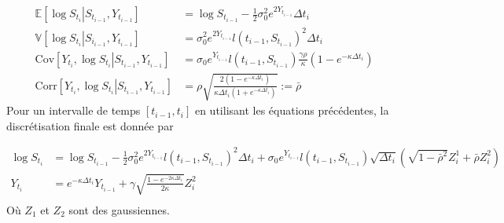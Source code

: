 \documentclass[a4paper,12pt]{report}
\numberwithin{equation}{section}
\theoremstyle{definition}
\numberwithin{equation}{section}
\begin{document}
\begin{equation}
\label{2}
\begin{split}
\mathbb{E}\left[\left.\log S_{t_i}\right\vert S_{t_{i-1}},Y_{t_{i-1}}\right]&=\log S_{t_{i-1}}-\frac{1}{2}\sigma_0^2e^{2Y_{t_{i-1}}}\Delta t_i\\
\mathbb{V}\left[\left.\log S_{t_i}\right\vert S_{i_{i-1}}, Y_{t_{i-1}}\right]&=\sigma_0^2e^{2Y_{t_{i-1}}}l(t_{i-1},S_{t_{i-1}})^2\Delta t_i\\
\text{Cov}\left[\left.Y_{t_i},\log S_{t_i}\right\vert S_{t_{i-1}}, Y_{t_{i-1}}\right]&=\sigma_0 e^{Y_{t_{i-1}}}l(t_{i-1},S_{t_{i-1}})\frac{\gamma\rho}{\kappa}\left(1-e^{-\kappa\Delta t_i}\right)\\
\text{Corr}\left[\left.Y_{t_i},\log S_{t_i}\right\vert S_{t_{i-1}}, Y_{t_{i-1}}\right]&=\rho\sqrt{\frac{2(1-e^{-\kappa\Delta t_i})}{\kappa\Delta t_i(1+e^{-\kappa\Delta t_i})}}:= \bar \rho
\end{split}
\end{equation}
Pour un intervalle de temps $[t_{i-1},t_i]$ en utilisant les équations précédentes, la discrétisation finale est donnée par

\begin{equation*}
\begin{split}
\log S_{t_i} &= \log S_{t_{i-1}}-\frac{1}{2}\sigma_0^2e^{2Y_{t_{i-1}}}l(t_{i-1},S_{t_{i-1}})^2\Delta t_i+\sigma_0e^{Y_{t_{i-1}}}l(t_{i-1},S_{t_{i-1}})\sqrt{\Delta t_i}\left(\sqrt{1-\bar{\rho}^2}Z^1_{i}+\bar{\rho}Z^2_i\right)\\
Y_{t_i} &= e^{-\kappa\Delta t_i}Y_{t_{i-1}}+\gamma\sqrt{\frac{1-e^{-2\kappa\Delta t_i}}{2\kappa}}Z^2_i\\
\end{split}
\end{equation*}
Où $Z_1$ et $Z_2$ sont des gaussiennes.
\end{document}
